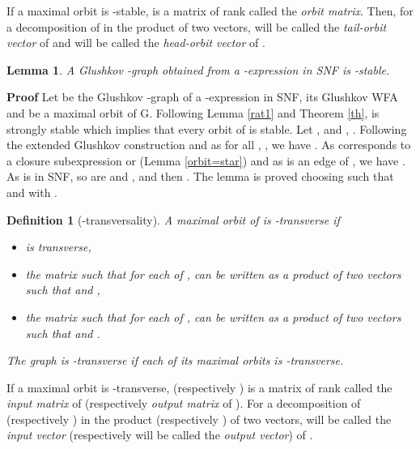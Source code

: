 \documentclass[11pt]{article}
\newtheorem{definition}[theorem]{Definition}
\newtheorem{lemma}[theorem]{Lemma}
\begin{document}
If a maximal orbit  is -stable,  is a matrix of rank  called the {\it orbit matrix}. Then, for a decomposition of  in the product  of two vectors,  will be called the {\it tail-orbit vector} of  and  will be called the {\it head-orbit vector} of . 
\begin{lemma}\label{lmKstable}
A Glushkov -graph obtained from a -expression  in SNF is -stable.
\end{lemma}
{\bf Proof }
Let  be the Glushkov -graph of a -expression  in SNF,  its Glushkov WFA  and  be a maximal orbit of G. 
Following Lemma \ref{rat1} and Theorem \ref{th},  is strongly stable which implies that every orbit of  is stable. 
Let ,  and , . Following the extended Glushkov construction and as for all , , we have . As  corresponds to a closure subexpression  or  (Lemma \ref{orbit=star}) and as  is an edge of , we have . As  is in SNF, so are  and ,  and then . The lemma is proved  choosing  such that   and  with .
\cqfd

\begin{definition}[-transversality]\label{Ktransverse}
A maximal orbit  of  is -transverse if 
\begin{itemize} 
\item   is transverse,
\item the matrix  such that   for each  of , can be written
as a product  of two vectors such that  and
,
\item the matrix  such that
 for each  of , can be written
as a product  of two vectors such that  and .
\end{itemize}
The graph  is -transverse if each of its maximal orbits is -transverse.
\end{definition}

If a maximal orbit  is -transverse,  (respectively ) is a matrix of rank  called the {\it input matrix} of  (respectively {\it output matrix} of ). For a decomposition of  (respectively ) in the product  (respectively ) of two vectors,  will be called the {\it input vector} (respectively  will be called the {\it output vector}) of . 
\end{document}

